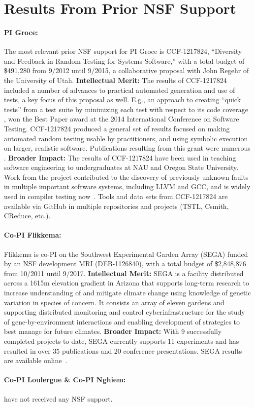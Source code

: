 \section{Results From Prior NSF Support}

\paragraph{PI Groce:}
The most relevant prior NSF support for PI Groce is
CCF-1217824, ``Diversity and Feedback in Random Testing for Systems
Software,'' with a total budget of \$491,280 from 9/2012 until 9/2015,
a collaborative proposal with John Regehr of the University of
Utah. {\bf Intellectual Merit:} The results of CCF-1217824 included a
number of advances to practical automated generation and use of tests,
a key focus of this proposal as well.  E.g., an approach to creating ``quick
tests'' from a test suite by minimizing each
test with respect to its code coverage \cite{icst2014}, won the
Best Paper award at the 2014 International Conference on Software
Testing.  CCF-1217824
produced a general set of results focused on making automated random
testing usable by practitioners, and using symbolic execution on
larger, realistic software.  Publications resulting from this grant
were numerous
\cite{Onward14,PLDI13,issta14,icst2014,helphelp,DirectedSwarm,stvrcausereduce,tstlsttt,ISSTA15,ASEAdeq}. {\bf
  Broader
  Impact:} The results of CCF-1217824 have been used in teaching software
engineering to undergraduates at NAU and Oregon State University.
Work from the project contributed to the discovery of previously
unknown faults in multiple important software
systems, including LLVM and GCC, and is widely used in compiler
testing now~\cite{ZhendongPLDI14,beginnerluck,dewey2015fuzzing,le2015randomized}.
Tools and data sets from CCF-1217824 are available via GitHub in
multiple repositories and projects (TSTL, Csmith, CReduce, etc.).

\paragraph{Co-PI Flikkema:} Flikkema is co-PI on the Southwest Experimental Garden Array (SEGA)
funded by an NSF development MRI
(DEB-1126840), with a total budget of \$2,848,876 from 10/2011 until
9/2017. {\bf Intellectual Merit:} SEGA is a facility
distributed across a 1615m elevation gradient in Arizona that supports
long-term research to increase understanding of and mitigate climate
change using knowledge of genetic variation in species of concern. It
consists an array of eleven gardens and supporting distributed
monitoring and control cyberinfrastructure for the study of
gene-by-environment interactions and enabling development of
strategies to best manage for future climates. {\bf Broader
  Impact:}  With 9 successfully completed projects to date, SEGA
currently supports 11 experiments and has resulted in over 35
publications and 20 conference presentations.  SEGA results are
available online~\cite{SEGA}.

\paragraph{Co-PI Loulergue \& Co-PI Nghiem:} have not received any NSF support.
